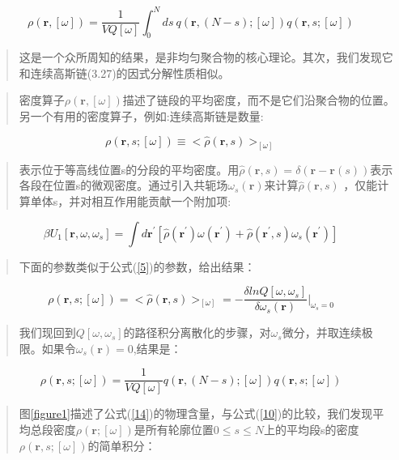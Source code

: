 \begin{equation}\label{10}
\rho(\mathbf{r},[\omega])=\frac{1}{VQ[\omega]}\int_{0}^{N}ds~q(\mathbf{r},(N-s);[\omega])q(\mathbf{r},s;[\omega])
\end{equation}
\begin{quotation}
这是一个众所周知的结果，是非均匀聚合物的核心理论。其次，我们发现它和连续高斯链(3.27)的因式分解性质相似。
\end{quotation}
\begin{quotation}
密度算子$\rho(\mathbf{r},[\omega])$描述了链段的平均密度，而不是它们沿聚合物的位置。另一个有用的密度算子，例如:连续高斯链是数量:
\end{quotation}
\begin{equation}\label{11}
\rho(\mathbf{r},s;[\omega])\equiv <\hat{\rho}(\mathbf{r},s)>_{[\omega]}
\end{equation}
\begin{quotation}
表示位于等高线位置s的分段的平均密度。用$\hat{\rho}(\mathbf{r},s)=\delta(\mathbf{r}-\mathbf{r}(s))$表示各段在位置s的微观密度。通过引入共轭场$\omega_s(\mathbf{r})$来计算$\hat{\rho}(\mathbf{r},s)$
，仅能计算单体s，并对相互作用能贡献一个附加项:
\end{quotation}
\begin{equation}\label{12}
\beta U_1[\mathbf{r},\omega ,\omega_s]=\int d\mathbf{r}^{'}[\hat{\rho}(\mathbf{r}^{'})\omega (\mathbf{r}^{'})+\hat{\rho}(\mathbf{r}^{'},s)\omega_s(\mathbf{r}^{'})]
\end{equation}
\begin{quotation}
下面的参数类似于公式(\ref{5})的参数，给出结果：
\end{quotation}
\begin{equation}\label{13}
\rho(\mathbf{r},s;[\omega])=<\hat{\rho}(\mathbf{r},s)>_{[\omega]}
=-\frac{\delta lnQ[\omega,\omega_s]}{\delta \omega_s(\mathbf{r})} \bigg |_{\omega_s=0}
\end{equation}
\begin{quotation}
我们现回到$Q[\omega,\omega_s]$的路径积分离散化的步骤，对$\omega_s$微分，并取连续极限。如果令$\omega_s(\mathbf{r})=0$,结果是：
\end{quotation}
\begin{equation}\label{14}
\rho(\mathbf{r},s;[\omega])=\frac{1}{VQ[\omega]}q(\mathbf{r},(N-s);[\omega])q(\mathbf{r},s;[\omega])
\end{equation}
\begin{quotation}
图\ref{figure1}描述了公式(\ref{14})的物理含量，与公式(\ref{10})的比较，我们发现平均总段密度$\rho(\mathbf{r};[\omega])$是所有轮廓位置$0\le s\le N$上的平均段s的密度$\rho(\mathbf{r},s;[\omega])$的简单积分：
\end{quotation}
